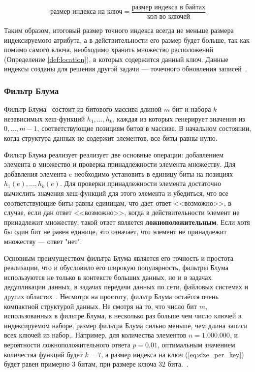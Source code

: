 \begin{equation}\label{eq:size_per_key}
    \textrm{размер индекса на ключ} = \frac{\textrm{размер индекса в байтах}}{\textrm{кол-во ключей}}
\end{equation}

Таким образом, итоговый размер точного индекса всегда не меньше размера индексируемого атрибута, а в действительности его размер будет больше, так как помимо самого ключа, необходимо хранить множество расположений (Определение \ref{def:location}), в которых содержится данный ключ. Данные индексы созданы для решения другой задачи --- точечного обновления записей~\cite{Hudi_RLI}.

\subsubsection{Фильтр Блума} 

Фильтр Блума~\cite{Bloom_Filter} состоит из битового массива длиной $m$ бит и набора $k$ независимых хеш-функций $h_1, \dots, h_k$, каждая из которых генерирует значения из ${0, \dots, m-1}$, соответствующие позициям битов в массиве. В начальном состоянии, когда структура данных не содержит элементов, все биты равны нулю.

Фильтр Блума реализует реализует две основные операции: добавлением элемента в множество и проверка принадлежности элемента множеству. Для добавления элемента $e$ необходимо установить в единицу биты на позициях $h_1(e), \dots, h_k(e)$. Для проверки принадлежности элемента достаточно вычислить значения хеш-функций для этого элемента и убедиться, что все соответствующие биты равны единицам, что дает ответ {<<возможно>>}, в случае, если дан ответ {<<возможно>>}, когда в действительности элемент не принадлежит множеству, такой ответ является \textbf{ложноположительным}. Если хотя бы один бит не равен единице, это означает, что элемент не принадлежит множеству — ответ "нет".

Основным преимуществом фильтра Блума является его точность и простота реализации, что и обусловило его широкую популярность, фильтры Блума используются не только в контексте больших данных, но и в задачах дедупликации данных, в задачах передачи данных по сети, файловых системах и других областях~\cite{Role_of_bloom_filter_in_big_data}. Несмотря на простоту, фильтр Блума остаётся очень компактной структурой данных. Не смотря на то, что число бит $m$, использованных в фильтре Блума, в несколько раз больше чем число ключей в индексируемом наборе, размер фильтра Блума сильно меньше, чем длина записи всех ключей из набор,. Например, для количества элементов $n = 1.000.000$,  и вероятности ложноположительного ответа $p = 0.01$, оптимальным значением количества функций будет $k = 7$, а размер индекса на ключ (\ref{eq:size_per_key}) будет равен примерно 3 битам, при размере ключа 32 бита.~\cite{Bloom_Filter}.

